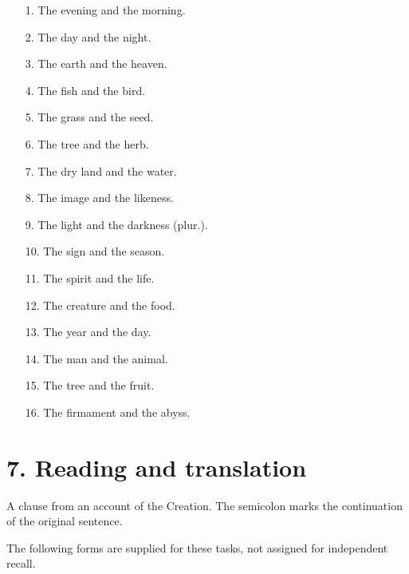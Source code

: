 \begin{enumerate}
\item[1.] The evening and the morning.
\item[2.] The day and the night.
\item[3.] The earth and the heaven.
\item[4.] The fish and the bird.
\item[5.] The grass and the seed.
\item[6.] The tree and the herb.
\item[7.] The dry land and the water.
\item[8.] The image and the likeness.
\item[9.] The light and the darkness (plur.).
\item[10.] The sign and the season.
\item[11.] The spirit and the life.
\item[12.] The creature and the food.
\item[13.] The year and the day.
\item[14.] The man and the animal.
\item[15.] The tree and the fruit.
\item[16.] The firmament and the abyss.
\end{enumerate}


\clearpage
{}
\section*{7. Reading and translation}


A clause from an account of the Creation. The semicolon marks the continuation of the original sentence.


The following forms are supplied for these tasks, not assigned for independent recall.


